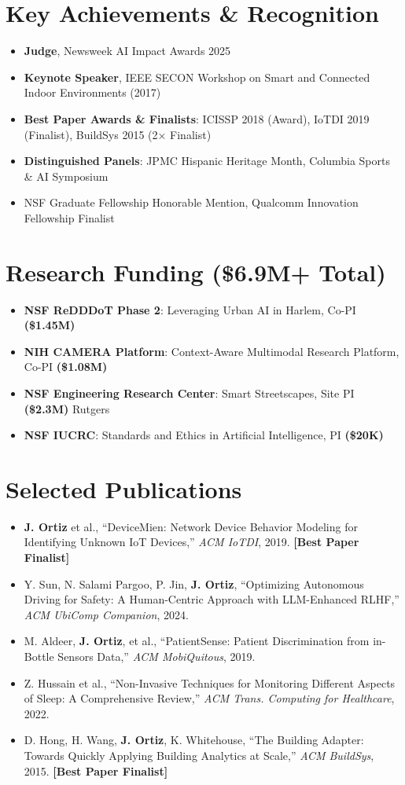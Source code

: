 \documentclass[11pt,letterpaper]{article}
\newcommand{\listentry}[1]{
    \item[\textcolor{accentBlue}{\small\faAngleRight}] #1
}
\begin{document}
\section{Key Achievements \& Recognition}
\begin{itemize}
\listentry{\textbf{\color{primaryBlue}Judge}, Newsweek AI Impact Awards 2025}
\listentry{\textbf{\color{primaryBlue}Keynote Speaker}, IEEE SECON Workshop on Smart and Connected Indoor Environments (2017)}
\listentry{\textbf{\color{primaryBlue}Best Paper Awards \& Finalists}: ICISSP 2018 (Award), IoTDI 2019 (Finalist), BuildSys 2015 (2× Finalist)}
\listentry{\textbf{\color{primaryBlue}Distinguished Panels}: JPMC Hispanic Heritage Month, Columbia Sports \& AI Symposium}
\listentry{NSF Graduate Fellowship Honorable Mention, Qualcomm Innovation Fellowship Finalist}
\end{itemize}

\section{Research Funding (\$6.9M+ Total)}
\begin{itemize}
\listentry{\textbf{\color{primaryBlue}NSF ReDDDoT Phase 2}: Leveraging Urban AI in Harlem, Co-PI \textbf{(\$1.45M)}}
\listentry{\textbf{\color{primaryBlue}NIH CAMERA Platform}: Context-Aware Multimodal Research Platform, Co-PI \textbf{(\$1.08M)}}
\listentry{\textbf{\color{primaryBlue}NSF Engineering Research Center}: Smart Streetscapes, Site PI \textbf{(\$2.3M)} Rutgers}
\listentry{\textbf{\color{primaryBlue}NSF IUCRC}: Standards and Ethics in Artificial Intelligence, PI \textbf{(\$20K)}}
\end{itemize}

\section{Selected Publications}
\begin{itemize}
\listentry{\textbf{J. Ortiz} et al., ``DeviceMien: Network Device Behavior Modeling for Identifying Unknown IoT Devices,'' \textit{ACM IoTDI}, 2019. \textbf{\color{accentBlue}[Best Paper Finalist]}}

\listentry{Y. Sun, N. Salami Pargoo, P. Jin, \textbf{J. Ortiz}, ``Optimizing Autonomous Driving for Safety: A Human-Centric Approach with LLM-Enhanced RLHF,'' \textit{ACM UbiComp Companion}, 2024.}

\listentry{M. Aldeer, \textbf{J. Ortiz}, et al., ``PatientSense: Patient Discrimination from in-Bottle Sensors Data,'' \textit{ACM MobiQuitous}, 2019.}

\listentry{Z. Hussain et al., ``Non-Invasive Techniques for Monitoring Different Aspects of Sleep: A Comprehensive Review,'' \textit{ACM Trans. Computing for Healthcare}, 2022.}

\listentry{D. Hong, H. Wang, \textbf{J. Ortiz}, K. Whitehouse, ``The Building Adapter: Towards Quickly Applying Building Analytics at Scale,'' \textit{ACM BuildSys}, 2015. \textbf{\color{accentBlue}[Best Paper Finalist]}}
\end{itemize}
\end{document}
